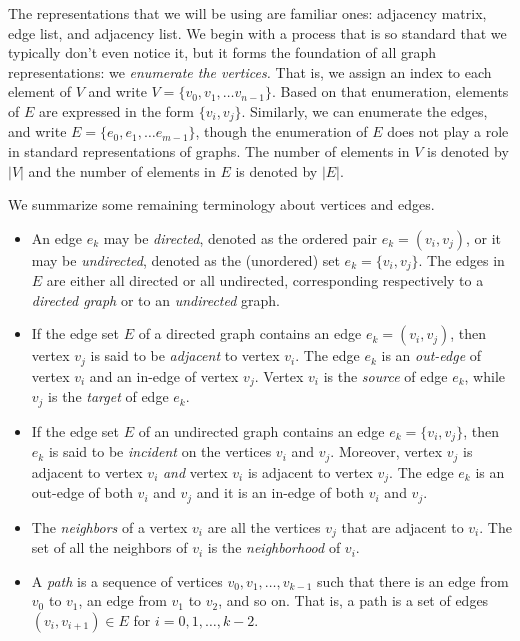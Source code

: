The representations that we will be using are familiar ones: adjacency matrix, edge list, and adjacency list.
We begin with a process that is so standard that we typically don't even notice it, but it forms
the foundation of all graph representations: we \emph{enumerate the vertices.}  That is, we assign an
index to each element of $V$ and write $V = \{v_0, v_1, \ldots v_{n-1}\}$.  Based on that enumeration,
elements of $E$ are expressed in the form $\{v_i, v_j\}$.  Similarly, we can enumerate the edges, and write  
$E = \{ e_0, e_1, \ldots e_{m-1}\}$, though the enumeration of $E$ does not play a role in standard
representations of graphs.
%
The number of elements in $V$ is denoted by $|V|$ and the number of elements in $E$ is denoted by $|E|$.

We summarize some remaining terminology about vertices and edges.
\begin{itemize}
\item 
An edge $e_k$ may  be \emph{directed}, denoted as the ordered pair $e_k=(v_i, v_j)$, or it may be
  \emph{undirected}, denoted as the (unordered) set $e_k=\{v_i, v_j\}$.  The edges 
in $E$ are either all directed or all undirected,
  corresponding respectively to a \emph{directed graph} or to an \emph{undirected} graph.
\item 
If the edge set $E$ of a directed graph contains an edge $e_k = (v_i,v_j)$, then
  vertex $v_j$ is said to be \emph{adjacent} to vertex $v_i$.  The edge $e_k$ is an
  \emph{out-edge} of vertex $v_i$ and an in-edge of vertex $v_j$.  Vertex $v_i$ is the \emph{source} of
  edge $e_k$, while $v_j$ is the \emph{target} of edge $e_k$.
\item If the edge set $E$ of an undirected graph contains an edge $e_k = \{v_i,v_j\}$, then
  $e_k$ is said to be \emph{incident} on the vertices $v_i$ and $v_j$.
  Moreover, vertex $v_j$ is adjacent to vertex $v_i$
  \emph{and} vertex $v_i$ is adjacent to vertex $v_j$.
  The edge $e_k$ is an out-edge of both $v_i$ and $v_j$ and it is an in-edge of both $v_i$ and $v_j$.
\item The \emph{neighbors} of a vertex $v_i$ are all the vertices $v_j$ that are adjacent to $v_i$.  The set of all the neighbors of $v_i$ is the \emph{neighborhood} of $v_i$.
\item A \emph{path} is a sequence of vertices $v_0, v_1, \ldots, v_{k-1}$ such that
there is an edge from $v_0$ to $v_1$, an edge from $v_1$ to $v_2$, and so on.
That is, a path is a set of edges $(v_i, v_{i+1}) \in E$ for  $i = 0, 1, \ldots, k-2$.
\end{itemize}


